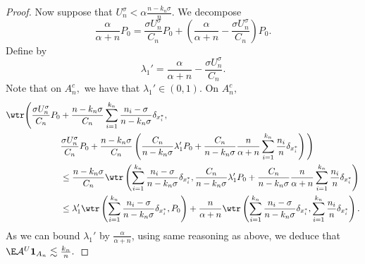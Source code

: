 \begin{proof}
    Now suppose that $U_n^\sigma < \alpha \frac{n - k_n \sigma}{n}.$ We decompose 
    \[
    \frac{\alpha}{\alpha + n}P_0 = \frac{ \sigma U_n^\sigma}{C_n}P_0 + \left( \frac{\alpha}{\alpha + n}- \frac{ \sigma U_n^\sigma}{C_n}\right) P_0.
    \]
    Define by 
    \[
    \lambda_1' = \frac{\alpha}{\alpha + n} - \frac{\sigma U_n^\sigma}{C_n}.
    \]
    Note that on $A_n^c,$ we have that $\lambda_1' \in (0,1).$ On $A_n^c,$
    \begin{align*}
        \wtr \Bigg( \frac{ \sigma U_n^\sigma}{C_n}P_0 & + \frac{n - k_n\sigma}{C_n}\sum_{i = 1}^{k_n}\frac{n_i - \sigma}{n - k_n\sigma}\delta_{x_i^*}, \\
        & \frac{ \sigma U_n^\sigma}{C_n}P_0 + \frac{n - k_n\sigma}{C_n}\left( \frac{C_n}{n - k_n\sigma}\lambda_1'P_0 + \frac{C_n}{n-k_n\sigma}\frac{n}{\alpha + n}\sum_{i = 1}^{k_n}\frac{n_i}{n}\delta_{x_i^*}\right) \Bigg) \\
        & \leq \frac{n - k_n\sigma}{C_n}\wtr \left( \sum_{i = 1}^{k_n}\frac{n_i - \sigma}{n - k_n\sigma}\delta_{x_i^*}, 
        \frac{C_n}{n - k_n\sigma}\lambda_1'P_0 + \frac{C_n}{n - k_n\sigma}\frac{n}{\alpha + n}\sum_{i = 1}^{k_n}\frac{n_i}{n}\delta_{x_i^*}\right) \\
        & \leq \lambda_1'\wtr\left( \sum_{i = 1}^{k_n}\frac{n_i - \sigma}{n - k_n\sigma}\delta_{x_i^*}, P_0\right) + \frac{n}{\alpha + n}\wtr \left(\sum_{i = 1}^{k_n}\frac{n_i - \sigma}{n - k_n \sigma}\delta_{x_i^*}, \sum_{i = 1}^{k_n}\frac{n_i}{n}\delta_{x_i^*} \right).
    \end{align*}
    As we can bound $\lambda_1'$ by $\frac{\alpha}{\alpha + n}$, using same reasoning as above, we deduce that $\E \mathcal{A}^U \mathbf{1}_{A_n} \lesssim \frac{k_n}{n}.$
\end{proof}
